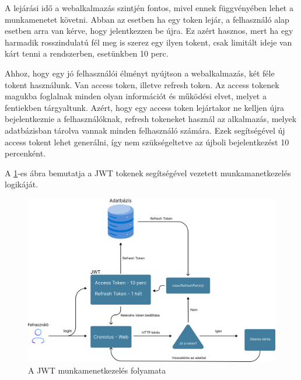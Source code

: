 A lejárási idő a webalkalmazás szintjén fontos, mivel ennek függvényében lehet a munkamenetet követni. Abban az esetben ha egy token lejár, a felhasználó alap esetben arra van kérve, hogy jelentkezzen be újra. Ez azért hasznos, mert ha egy harmadik rosszindulatú fél meg is szerez egy ilyen tokent, csak limitált ideje van kárt tenni a rendszerben, esetünkben 10 perc.

Ahhoz, hogy egy jó felhasználói élményt nyújtson a webalkalmazás, két féle tokent használunk. Van access token, illetve refresh token. Az access tokenek magukba foglalnak minden olyan információt és működési elvet, melyet a fentiekben tárgyaltunk. Azért, hogy egy access token lejártakor ne kelljen újra bejelentkeznie a felhasználóknak, refresh tokeneket használ az alkalmazás, melyek adatbázisban tárolva vannak minden felhasználó számára. Ezek segítségével új access tokent lehet generálni, így nem szükségeltetve az újboli bejelentkezést 10 percenként.

A \ref{fig:jwt_auth_process}-es ábra bemutatja a JWT tokenek segítségével vezetett munkamanetkezelés logikáját.

\begin{figure}[h]
  \centering
  \includegraphics[width=\textwidth]{images/jwt_auth_process.png}
  \caption{A JWT munkamenetkezelés folyamata}
  \label{fig:jwt_auth_process}
\end{figure}

  